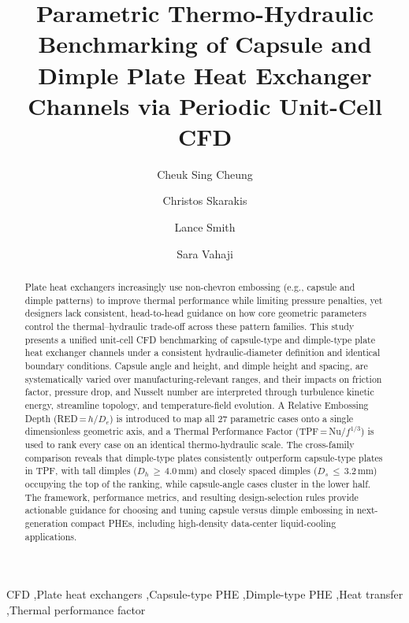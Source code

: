 \documentclass[review,12pt]{elsarticle}
\def\corref#1{}%
\begin{document}
\begin{frontmatter}

\title{Parametric Thermo-Hydraulic Benchmarking of Capsule and Dimple Plate Heat Exchanger Channels via Periodic Unit-Cell CFD}

\author[rmit]{Cheuk Sing Cheung}
\author[rmit]{Christos Skarakis}
\author[inkorr]{Lance Smith}
\author[rmit]{Sara Vahaji\corref{cor1}}

\address[rmit]{School of Engineering, RMIT University, Melbourne, VIC 3000, Australia}

\address[inkorr]{InKorr Pty Ltd, Knoxfield, VIC 3180, Australia}

\begin{abstract}
Plate heat exchangers increasingly use non-chevron embossing (e.g., capsule and dimple patterns) to improve thermal performance while limiting pressure penalties, yet designers lack consistent, head-to-head guidance on how core geometric parameters control the thermal--hydraulic trade-off across these pattern families. This study presents a unified unit-cell CFD benchmarking of capsule-type and dimple-type plate heat exchanger channels under a consistent hydraulic-diameter definition and identical boundary conditions. Capsule angle and height, and dimple height and spacing, are systematically varied over manufacturing-relevant ranges, and their impacts on friction factor, pressure drop, and Nusselt number are interpreted through turbulence kinetic energy, streamline topology, and temperature-field evolution. A Relative Embossing Depth (RED\,=\,$h/D_e$) is introduced to map all 27 parametric cases onto a single dimensionless geometric axis, and a Thermal Performance Factor (TPF\,=\,Nu/$f^{1/3}$) is used to rank every case on an identical thermo-hydraulic scale. The cross-family comparison reveals that dimple-type plates consistently outperform capsule-type plates in TPF, with tall dimples ($D_h$\,$\geq$\,4.0\,mm) and closely spaced dimples ($D_s$\,$\leq$\,3.2\,mm) occupying the top of the ranking, while capsule-angle cases cluster in the lower half. The framework, performance metrics, and resulting design-selection rules provide actionable guidance for choosing and tuning capsule versus dimple embossing in next-generation compact PHEs, including high-density data-center liquid-cooling applications.
\end{abstract}

\begin{keyword}
CFD \sep Plate heat exchangers \sep Capsule-type PHE \sep Dimple-type PHE \sep Heat transfer \sep Thermal performance factor
\end{keyword}

\end{frontmatter}
\end{document}

